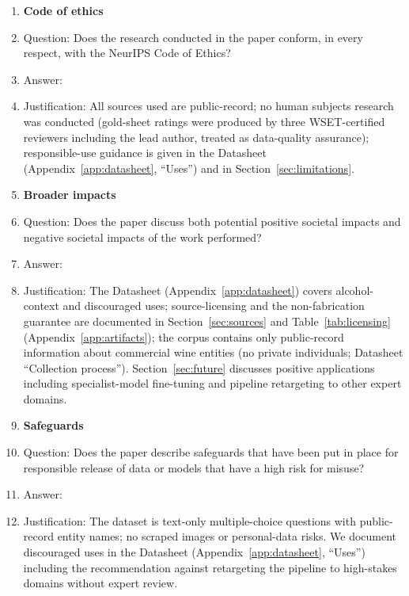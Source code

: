 \begin{enumerate}
\item {\bf Code of ethics}
    \item[] Question: Does the research conducted in the paper conform, in every respect, with the NeurIPS Code of Ethics?
    \item[] Answer: \answerYes{}
    \item[] Justification: All sources used are public-record; no human subjects research was conducted (gold-sheet ratings were produced by three WSET-certified reviewers including the lead author, treated as data-quality assurance); responsible-use guidance is given in the Datasheet (Appendix~\ref{app:datasheet}, ``Uses'') and in Section~\ref{sec:limitations}.

\item {\bf Broader impacts}
    \item[] Question: Does the paper discuss both potential positive societal impacts and negative societal impacts of the work performed?
    \item[] Answer: \answerYes{}
    \item[] Justification: The Datasheet (Appendix~\ref{app:datasheet}) covers alcohol-context and discouraged uses; source-licensing and the non-fabrication guarantee are documented in Section~\ref{sec:sources} and Table~\ref{tab:licensing} (Appendix~\ref{app:artifacts}); the corpus contains only public-record information about commercial wine entities (no private individuals; Datasheet ``Collection process''). Section~\ref{sec:future} discusses positive applications including specialist-model fine-tuning and pipeline retargeting to other expert domains.

\item {\bf Safeguards}
    \item[] Question: Does the paper describe safeguards that have been put in place for responsible release of data or models that have a high risk for misuse?
    \item[] Answer: \answerYes{}
    \item[] Justification: The dataset is text-only multiple-choice questions with public-record entity names; no scraped images or personal-data risks. We document discouraged uses in the Datasheet (Appendix~\ref{app:datasheet}, ``Uses'') including the recommendation against retargeting the pipeline to high-stakes domains without expert review.


\end{enumerate}

